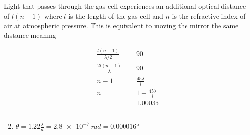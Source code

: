 \documentclass{article}
\begin{document}
Light that passes through the gas cell experiences an additional optical distance of $l (n - 1)$ where $l$ is the length of the gas cell and $n$ is the refractive index of air at atmospheric pressure. This is equivalent to moving the mirror the same distance meaning

\begin{align*}
  \frac{l (n - 1)}{\lambda / 2} & = 90                       \\
  \frac{2 l (n - 1)}{\lambda}   & = 90                       \\
  n - 1                         & = \frac{45 \lambda}{l}     \\
  n                             & = 1 + \frac{45 \lambda}{l} \\
                                & = 1.00036
\end{align*}

\setcounter{subsection}{9}
\subsection{}

\begin{enumerate}
  \setcounter{enumi}{1}
  \item $\theta = 1.22 \frac{\lambda}{d} = \qty{2.8e-7}{rad} = \ang{0.000016}$
\end{enumerate}
\end{document}
